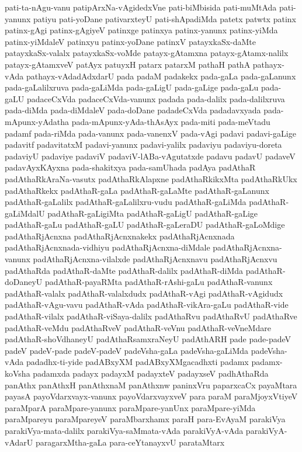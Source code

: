 {pati-ta-nAgu-vanu
patipArxNa-vAgidedxVne
pati-biMbisida
pati-muMtAda
pati-yanunx
patiyu
pati-yoDane
pativarxteyU
pati-shApadiMda
patetx
patwtx
patinx
patinx-gAgi
patinx-gAgiyeV
patinxge
patinxya
patinx-yanunx
patinx-yiMda
patinx-yiMdaleV
patinxyu
patinx-yoDane
patinxV
patayxkaSx-daMte
patayxkaSx-valalx
patayxkaSx-voMde
patayx-gAtamxna
patayx-gAtamx-nalilx
patayx-gAtamxveV
patAyx
patuyxH
patarx
patarxM
pathaH
pathA
pathayx-vAda
pathayx-vAdadAdxdarU
pada
padaM
padakekx
pada-gaLa
pada-gaLanunx
pada-gaLalilxruva
pada-gaLiMda
pada-gaLigU
pada-gaLige
pada-gaLu
pada-gaLU
padaceCxVda
padaceCxVda-vanunx
padada
pada-dalilx
pada-dalilxruva
pada-diMda
pada-diMdaleV
pada-doDane
padadeCxVda
padadavxyada
pada-mApunx-yAdatha
pada-mApunx-yAda-thAsAyx
pada-miti
pada-meVtadu
padamf
pada-riMda
pada-vanunx
pada-vanenxV
pada-vAgi
padavi
padavi-gaLige
padavitf
padavitatxM
padavi-yanunx
padavi-yalilx
padaviyu
padaviyu-doreta
padaviyU
padaviye
padaviV
padaviV-lABa-vAgutatxde
padavu
padavU
padaveV
padavAyxKAyxna
pada-shakitxya
pada-samUhada
padAya
padAthaR
padAthaRkAraNa-vasutx
padAthaRkAlapxne
padAthaRkikxMta
padAthaRkUkx
padAthaRkekx
padAthaR-gaLa
padAthaR-gaLaMte
padAthaR-gaLanunx
padAthaR-gaLalilx
padAthaR-gaLalilxru-vudu
padAthaR-gaLiMda
padAthaR-gaLiMdalU
padAthaR-gaLigiMta
padAthaR-gaLigU
padAthaR-gaLige
padAthaR-gaLu
padAthaR-gaLU
padAthaR-gaLeraDU
padAthaR-gaLoMdige
padAthaRjAcnxna
padAthaRjAcnxnakekx
padAthaRjAcnxnada
padAthaRjAcnxnada-vidhiyu
padAthaRjAcnxna-diMdale
padAthaRjAcnxna-vanunx
padAthaRjAcnxna-vilalxde
padAthaRjAcnxnavu
padAthaRjAcnxvu
padAthaRda
padAthaR-daMte
padAthaR-dalilx
padAthaR-diMda
padAthaR-doDaneyU
padAthaR-payaRMta
padAthaR-rAshi-gaLu
padAthaR-vanunx
padAthaR-valalx
padAthaR-valalxdudx
padAthaR-vAgi
padAthaR-vAgidudx
padAthaR-vAgu-vavu
padAthaR-vAda
padAthaR-vikAra-gaLu
padAthaR-vide
padAthaR-vilalx
padAthaR-viSaya-dalilx
padAthaRvu
padAthaRvU
padAthaRve
padAthaR-veMdu
padAthaRveV
padAthaR-veVnu
padAthaR-veVneMdare
padAthaR-shoVdhaneyU
padAthaRsamxraNeyU
padAthARH
pade
pade-padeV
padeV
padeV-pade
padeV-padeV
padeVsha-gaLa
padeVsha-gaLiMda
padeVsha-vAda
padadhx-ti-yide
padABxyXM
padABxyXMgacadhxti
padamx
padamx-koVsha
padamxda
padayx
padayxM
padayxteV
padayxseV
padhAthaRda
panAthx
panAthxH
panAthxnaM
panAthxnw
paninxVru
paparxcaCx
payaMtara
payasA
payoVdarxvayx-vanunx
payoVdarxvayxveV
para
paraM
paraMjoyxVtiyeV
paraMparA
paraMpare-yanunx
paraMpare-yanUnx
paraMpare-yiMda
paraMpareyu
paraMpareyeV
paraMbarxhamx
paraH
para-EvAyaM
parakiVya
parakiVya-mata-dalilx
parakiVya-saMmata-vAda
parakiVyA-vAda
parakiVyA-vAdarU
paragarxMtha-gaLa
para-ceYtanayxvU
parataMtarx
}
